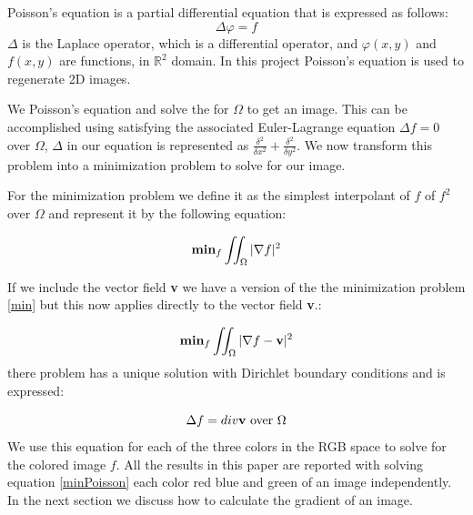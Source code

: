 \documentclass[10pt,twopage]{acmsiggraph}
\begin{document}
Poisson's equation is a partial differential equation that is expressed as follows:
\begin{equation} 
\ensuremath{\Delta \varphi = f}
\end{equation}
\ensuremath{\Delta} is the Laplace operator, which is a differential operator, and \ensuremath{ \varphi(x,y) } and $ f(x,y) $ are functions, in $\mathbb{R}^2$ domain. In this project Poisson's equation is used to regenerate 2D images. 






We Poisson's equation and solve the for \ensuremath{\Omega} to get an image. This can be accomplished using satisfying the associated Euler-Lagrange equation \ensuremath{\Delta f = 0} over \ensuremath{\Omega}, \ensuremath{\Delta} in our equation is represented as \ensuremath{\frac{\delta^2}{\delta x^2} + \frac{\delta^2}{\delta y^2}}. We now transform this problem into a minimization problem to solve for our image.

For the minimization problem we define it as the simplest interpolant of $f$ of $f^2$ over \ensuremath{\Omega} and represent it by the following equation:

\begin{equation}
\ensuremath{{\bf min}_f \iint_{\Omega}{|\nabla f|^2}}
\label{min}
\end{equation}

If we include the vector field {\bf v} we have a version of the the minimization problem \ref{min} but this now applies directly to the vector field {\bf v}.:

\begin{equation}
{\bf min}_f \iint_{\Omega}{|\nabla f - {\bf v}|^2}
\label{minPoisson}
\end{equation}
there problem has a unique solution with Dirichlet boundary conditions and is expressed:

\begin{equation}
\Delta f = div {\bf v} \mbox{ over \ensuremath{\Omega}}
\label{poissonEqn}
\end{equation}
We use this equation for each of the three colors in the RGB space to solve for the colored image $f$. All the results in this paper are reported with solving equation \ref{minPoisson} each color red blue and green of an image independently. In the next section we discuss how to calculate the gradient of an image.
\end{document}
